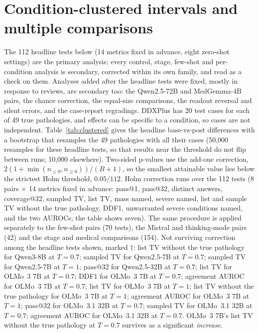 \documentclass[11pt]{article}
\begin{document}
\section{Condition-clustered intervals and multiple comparisons}\label{app:clustered}
The 112 headline tests below (14 metrics fixed in advance, eight zero-shot settings) are the primary analysis; every control, stage, few-shot and per-condition analysis is secondary, corrected within its own family, and read as a check on them. Analyses added after the headline tests were fixed, mostly in response to reviews, are secondary too: the Qwen2.5-72B and MedGemma-4B pairs, the chance correction, the equal-size comparisons, the readout reversal and silent errors, and the case-report regradings. DDXPlus has 20 test cases for each of 49 true pathologies, and effects can be specific to a condition, so cases are not independent. Table~\ref{tab:clustered} gives the headline base-vs-post differences with a bootstrap that resamples the 49 pathologies with all their cases (50,000 resamples for these headline tests, so that results near the threshold do not flip between runs; 10,000 elsewhere). Two-sided p-values use the add-one correction, $2(1+\min(n_{\le 0}, n_{\ge 0}))/(B+1)$, so the smallest attainable value lies below the strictest Holm threshold, $0.05/112$. Holm correction runs over the 112 tests (8 pairs $\times$ 14 metrics fixed in advance: pass@1, pass@32, distinct answers, coverage@32, sampled TV, list TV, mass named, severe named, list and sample TV without the true pathology, DDF1, unwarranted severe conditions named, and the two AUROCs; the table shows seven). The same procedure is applied separately to the few-shot pairs (70 tests), the Mistral and thinking-mode pairs (42) and the stage and medical comparisons (154). Not surviving correction among the headline tests shown, marked $\dagger$: list TV without the true pathology for Qwen3-8B at $T{=}0.7$; sampled TV for Qwen2.5-7B at $T{=}0.7$; sampled TV for Qwen2.5-7B at $T{=}1$; pass@32 for Qwen2.5-32B at $T{=}0.7$; list TV for OLMo~3 7B at $T{=}0.7$; DDF1 for OLMo~3 7B at $T{=}0.7$; agreement AUROC for OLMo~3 7B at $T{=}0.7$; list TV for OLMo~3 7B at $T{=}1$; list TV without the true pathology for OLMo~3 7B at $T{=}1$; agreement AUROC for OLMo~3 7B at $T{=}1$; pass@32 for OLMo~3.1 32B at $T{=}0.7$; sampled TV for OLMo~3.1 32B at $T{=}0.7$; agreement AUROC for OLMo~3.1 32B at $T{=}0.7$. OLMo~3 7B's list TV without the true pathology at $T{=}0.7$ survives as a significant \emph{increase}.
\end{document}
